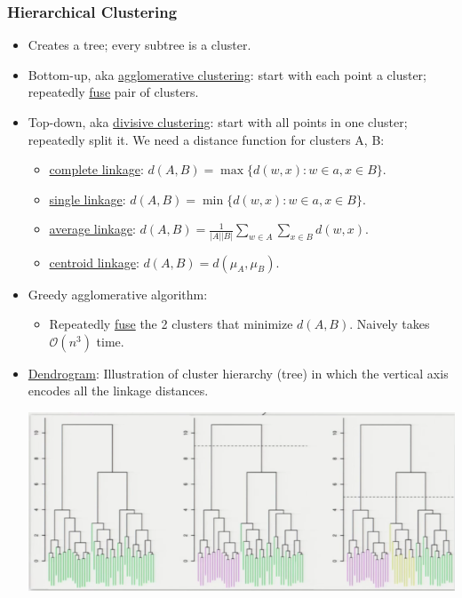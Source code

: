 \documentclass[10pt]{article}
\newcommand{\bigo}{\mathcal{O}}
\begin{document}
\subsubsection*{Hierarchical Clustering}
\begin{itemize}
	\item Creates a tree; every subtree is a cluster.
	\item Bottom-up, aka \underline{agglomerative clustering}:
		start with each point a cluster; repeatedly \underline{fuse} pair of clusters.
	\item Top-down, aka \underline{divisive clustering}:
		start with all points in one cluster; repeatedly split it.
		We need a distance function for clusters A, B:
		\begin{itemize}
			\item \underline{complete linkage}: $d(A, B) = \max \{ d(w,x): w \in a, x \in B\}$.
			\item \underline{single linkage}: $d(A, B) = \min \{ d(w,x): w \in a, x \in B\}$.
			\item \underline{average linkage}: $d(A, B) = \frac{1}{|A||B|} \sum_{w \in A} \sum_{x \in B} d(w, x)$.
			\item \underline{centroid linkage}: $d(A, B) = d(\mu_{A}, \mu_{B})$.
		\end{itemize}
	\item Greedy agglomerative algorithm:
		\begin{itemize}
			\item Repeatedly \underline{fuse} the 2 clusters that minimize $d(A, B)$. Naively takes $\bigo(n^{3})$ time.
		\end{itemize}
	\item \underline{Dendrogram}: Illustration of cluster hierarchy (tree) in which the vertical axis encodes all the linkage distances.
		\begin{center}
			\includegraphics[scale=0.6]{../images/dendrogram}

\end{center}
\end{itemize}
\end{document}

